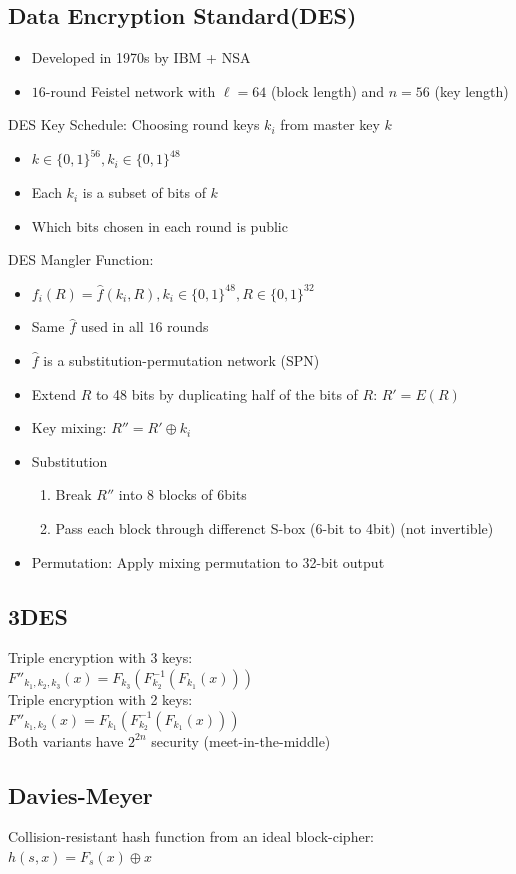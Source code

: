 \subsection*{Data Encryption Standard(DES)}
\begin{itemize}
    \item Developed in 1970s by IBM + NSA
    \item $16$-round Feistel network with $\ell = 64$ (block length) and $n = 56$ (key length)
\end{itemize}
DES Key Schedule: Choosing round keys $k_i$ from master key $k$
\begin{itemize}
    \item $k\in \{0,1\}^{56},k_i\in \{0,1\}^{48}$
    \item Each $k_i$ is a subset of bits of $k$
    \item Which bits chosen in each round is public
\end{itemize}
DES Mangler Function:
\begin{itemize}
    \item $f_i(R)=\hat{f}(k_i,R),k_i\in \{0,1\}^{48},R\in \{0,1\}^{32}$
    \item Same $\hat{f}$ used in all $16$ rounds
    \item $\hat{f}$ is a substitution-permutation network (SPN)
    \item Extend $R$ to 48 bits by duplicating half of the bits of $R$: $R'=E(R)$
    \item Key mixing: $R''=R'\oplus k_i$
    \item Substitution\begin{enumerate}
        \item Break $R''$ into 8 blocks of 6bits
        \item Pass each block through differenct S-box (6-bit to 4bit) (not invertible)
    \end{enumerate}
    \item Permutation: Apply mixing permutation to 32-bit output
\end{itemize}

\subsection*{3DES}
Triple encryption with 3 keys:\\
$F''_{k_1,k_2,k_3}(x)=F_{k_3}(F_{k_2}^{-1}(F_{k_1}(x)))$\\
Triple encryption with 2 keys:\\
$F''_{k_1,k_2}(x)=F_{k_1}(F_{k_2}^{-1}(F_{k_1}(x)))$\\
Both variants have $2^{2n}$ security (meet-in-the-middle)

\subsection*{Davies-Meyer}
Collision-resistant hash function from an ideal block-cipher:
$h(s,x)=F_s(x)\oplus x$